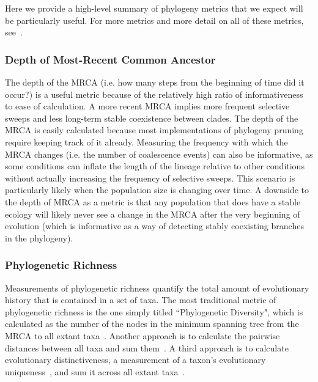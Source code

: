 \documentclass[letterpaper]{article}
\begin{document}
Here we provide a high-level summary of phylogeny metrics that we expect will be particularly useful. For more metrics and more detail on all of these metrics, see~\citep{winter_phylogenetic_2013, tucker_guide_2017}. 

\subsubsection{Depth of Most-Recent Common Ancestor}

The depth of the MRCA (i.e. how many steps from the beginning of time did it occur?) is a useful metric because of the relatively high ratio of informativeness to ease of calculation. A more recent MRCA implies more frequent selective sweeps and less long-term stable coexistence between clades. The depth of the MRCA is easily calculated because most implementations of phylogeny pruning require keeping track of it already. Measuring the frequency with which the MRCA changes (i.e. the number of coalescence events) can also be informative, as some conditions can inflate the length of the lineage relative to other conditions without actually increasing the frequency of selective sweeps. This scenario is particularly likely when the population size is changing over time. A downside to the depth of MRCA as a metric is that any population that does have a stable ecology will likely never see a change in the MRCA after the very beginning of evolution (which is informative as a way of detecting stably coexisting branches in the phylogeny). %

\subsubsection{Phylogenetic Richness}

Measurements of phylogenetic richness quantify the total amount of evolutionary history that is contained in a set of taxa. The most traditional metric of phylogenetic richness is the one simply titled ``Phylogenetic Diversity", which is calculated as the number of the nodes in the minimum spanning tree from the MRCA to all extant taxa~\citep{faith_conservation_1992}. Another approach is to calculate the pairwise distances between all taxa and sum them~\citep{tucker_guide_2017}. A third approach is to calculate evolutionary distinctiveness, a measurement of a taxon's evolutionary uniqueness~\citep{isaac_mammals_2007}, and sum it across all extant taxa~\citep{tucker_guide_2017}.
\end{document}
